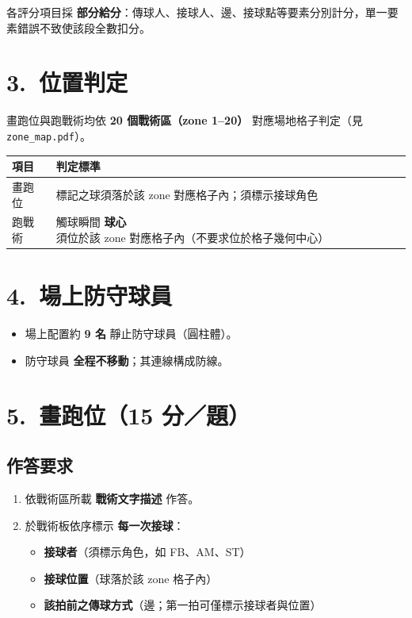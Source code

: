 \documentclass[11pt]{article}
\newcommand{\term}[1]{\textbf{#1}}
\begin{document}
各評分項目採 \term{部分給分}：傳球人、接球人、邊、接球點等要素分別計分，單一要素錯誤不致使該段全數扣分。

\section*{3.\ 位置判定}

畫跑位與跑戰術均依 \term{20 個戰術區（zone 1--20）} 對應場地格子判定（見 \texttt{zone\_map.pdf}）。

\vspace{0.4em}
\begin{tabular}{@{}ll@{}}
\toprule
\textbf{項目} & \textbf{判定標準} \\
\midrule
畫跑位 & 標記之球須落於該 zone 對應格子內；須標示接球角色 \\
跑戰術 & 觸球瞬間 \term{球心} 須位於該 zone 對應格子內（不要求位於格子幾何中心） \\
\bottomrule
\end{tabular}

\section*{4.\ 場上防守球員}

\begin{itemize}
  \item 場上配置約 \term{9 名} 靜止防守球員（圓柱體）。
  \item 防守球員 \term{全程不移動}；其連線構成防線。
\end{itemize}

\section*{5.\ 畫跑位（15 分／題）}

\subsection*{作答要求}

\begin{enumerate}
  \item 依戰術區所載 \term{戰術文字描述} 作答。
  \item 於戰術板依序標示 \term{每一次接球}：
  \begin{itemize}
    \item \textbf{接球者}（須標示角色，如 FB、AM、ST）
    \item \textbf{接球位置}（球落於該 zone 格子內）
    \item \textbf{該拍前之傳球方式}（邊；第一拍可僅標示接球者與位置）
  \end{itemize}
\end{enumerate}
\end{document}
